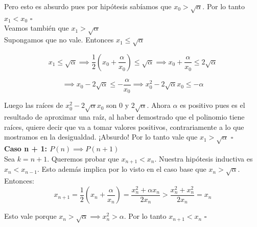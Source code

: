 Pero esto es absurdo pues por hipótesis sabíamos que $x_0 > \sqrt{\alpha}$. Por lo tanto $x_1 < x_0$ $\square$\\

Veamos también que $x_1 > \sqrt{\alpha}$\\

Supongamos que no vale. Entonces $x_1 \le \sqrt{\alpha}$

\begin{displaymath}
    x_1 \le \sqrt{\alpha} \implies \frac{1}{2}(x_0 + \frac{\alpha}{x_0}) \le \sqrt{\alpha} \implies x_0 + \frac{\alpha}{x_0} \le 2\sqrt{\alpha}
\end{displaymath}

\begin{displaymath}
    \implies x_0 - 2\sqrt{\alpha} \le -\frac{\alpha}{x_0} \implies x_0^2 - 2\sqrt{\alpha}x_0 \le -\alpha
\end{displaymath}

Luego las raíces de $x_0^2 - 2\sqrt{\alpha}x_0$ son $0$ y $2\sqrt{\alpha}$. Ahora $\alpha$ es positivo pues es el resultado de aproximar una raíz, al haber demostrado que el polinomio tiene raíces, quiere decir que va a tomar valores positivos, contrariamente a lo que mostramos en la desigualdad. ¡Absurdo! Por lo tanto vale que $x_1 > \sqrt{\alpha}$ $\square$\\

{\bf Caso n + 1: $P(n) \implies P(n + 1)$}\\
Sea $k = n + 1$. Queremos probar que $x_{n + 1} < x_n$. Nuestra hipótesis inductiva es $x_n < x_{n - 1}$. Esto además implica por lo visto en el caso base que $x_n > \sqrt{\alpha}$.\\

Entonces:
\begin{displaymath}
    x_{n + 1} = \frac{1}{2}(x_n + \frac{\alpha}{x_n}) = \frac{x_n^2 + \alpha x_n}{2x_n} > \frac{x_n^2 + x_n^2}{2x_n} = x_n
\end{displaymath}

Esto vale porque $x_n > \sqrt{\alpha} \implies x_n^2 > \alpha$. Por lo tanto $x_{n + 1} < x_n$ $\square$


